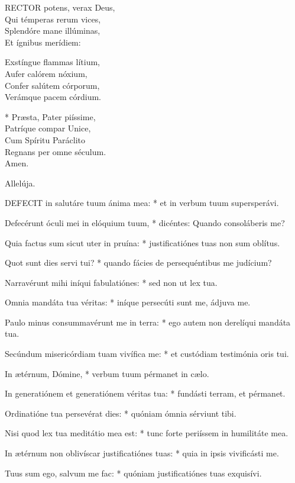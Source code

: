 \lettrine[lines=2]{R}{ECTOR} potens, verax Deus,\\
Qui témperas rerum vices,\\
Splendóre mane illúminas,\\
Et ígnibus merídiem:

Exstíngue flammas lítium,\\
Aufer calórem nóxium,\\
Confer salútem córporum,\\
Verámque pacem córdium.

* Præsta, Pater piíssime,\\
Patríque compar Unice,\\
Cum Spíritu Paráclito\\
Regnans per omne séculum.\\
Amen.

  Allelúja.


\lettrine[lines=2]{D}{EFECIT} in salutáre tuum ánima mea: * et in verbum tuum supersperávi.

Defecérunt óculi mei in elóquium tuum, * dicéntes: Quando consoláberis me?

Quia factus sum sicut uter in pruína: * justificatiónes tuas non sum oblítus.

Quot sunt dies servi tui? * quando fácies de persequéntibus me judícium?

Narravérunt mihi iníqui fabulatiónes: * sed non ut lex tua.

Omnia mandáta tua véritas: * iníque persecúti sunt me, ádjuva me.

Paulo minus consummavérunt me in terra: * ego autem non derelíqui mandáta tua.

Secúndum misericórdiam tuam vivífica me: * et custódiam testimónia oris tui.

In ætérnum, Dómine, * verbum tuum pérmanet in cælo.

In generatiónem et generatiónem véritas tua: * fundásti terram, et pérmanet.

Ordinatióne tua persevérat dies: * quóniam ómnia sérviunt tibi.

Nisi quod lex tua meditátio mea est: * tunc forte periíssem in humilitáte mea.

In ætérnum non oblivíscar justificatiónes tuas: * quia in ipsis vivificásti me.

Tuus sum ego, salvum me fac: * quóniam justificatiónes tuas exquisívi.

